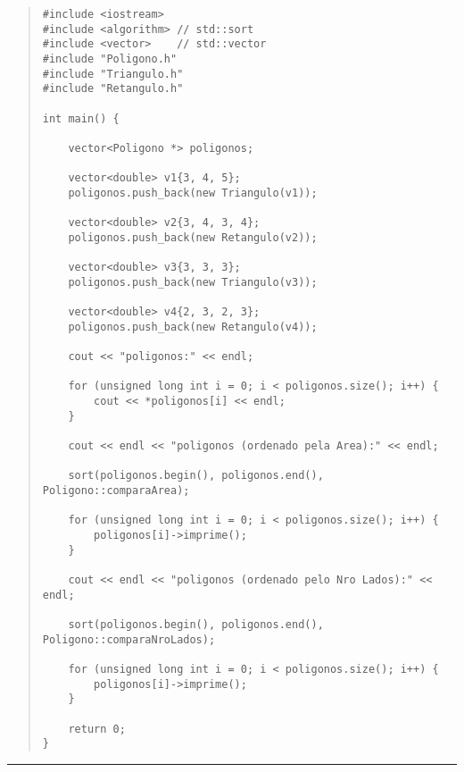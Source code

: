 \documentclass[12pt]{article}
\begin{document}
\begin{quote}
\begin{scriptsize}
\begin{verbatim}
#include <iostream>
#include <algorithm> // std::sort
#include <vector>    // std::vector
#include "Poligono.h"
#include "Triangulo.h"
#include "Retangulo.h"

int main() {

    vector<Poligono *> poligonos;

    vector<double> v1{3, 4, 5};
    poligonos.push_back(new Triangulo(v1));

    vector<double> v2{3, 4, 3, 4};
    poligonos.push_back(new Retangulo(v2));

    vector<double> v3{3, 3, 3};
    poligonos.push_back(new Triangulo(v3));

    vector<double> v4{2, 3, 2, 3};
    poligonos.push_back(new Retangulo(v4));

    cout << "poligonos:" << endl;

    for (unsigned long int i = 0; i < poligonos.size(); i++) {
        cout << *poligonos[i] << endl;
    }

    cout << endl << "poligonos (ordenado pela Area):" << endl;

    sort(poligonos.begin(), poligonos.end(), Poligono::comparaArea);

    for (unsigned long int i = 0; i < poligonos.size(); i++) {
        poligonos[i]->imprime();
    }

    cout << endl << "poligonos (ordenado pelo Nro Lados):" << endl;

    sort(poligonos.begin(), poligonos.end(), Poligono::comparaNroLados);

    for (unsigned long int i = 0; i < poligonos.size(); i++) {
        poligonos[i]->imprime();
    }

    return 0;
}
\end{verbatim}
\end{scriptsize}
\end{quote}

\par\noindent\rule{\textwidth}{0.4pt}
\end{document}
